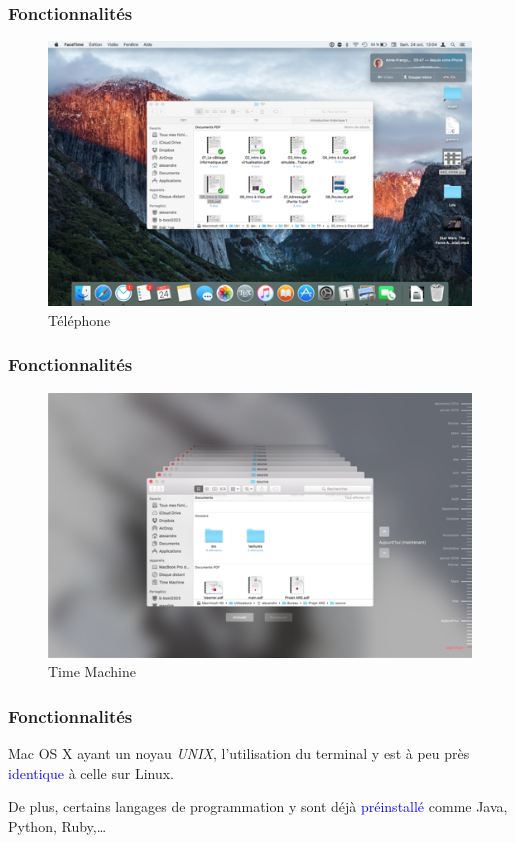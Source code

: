 \documentclass[aspectratio=169]{beamer}
\begin{document}
\begin{frame}
  \frametitle{Fonctionnalités}
  \begin{figure}[!h]
    \center
    \includegraphics[scale=0.22]
    {textures/images/mac/features/Phone.png}
    \caption{Téléphone}
  \end{figure}
\end{frame}

\begin{frame}
  \frametitle{Fonctionnalités}
  \begin{figure}[!h]
    \center
    \includegraphics[scale=0.22]
    {textures/images/mac/features/TimeMachine.png}
    \caption{Time Machine}
  \end{figure}
\end{frame}

\begin{frame}
  \frametitle{Fonctionnalités}
  Mac OS X ayant un noyau \textit{UNIX}, l'utilisation du terminal y est à peu près
  \textcolor{blue}{identique} à celle sur Linux.

  \hspace{0.5cm}

  De plus, certains langages de programmation y sont déjà
  \textcolor{blue}{préinstallé} comme Java, Python, Ruby,…
\end{frame}
\end{document}
